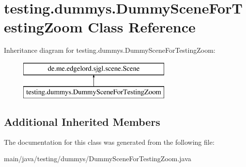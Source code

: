 \hypertarget{classtesting_1_1dummys_1_1_dummy_scene_for_testing_zoom}{}\section{testing.\+dummys.\+Dummy\+Scene\+For\+Testing\+Zoom Class Reference}
\label{classtesting_1_1dummys_1_1_dummy_scene_for_testing_zoom}
Inheritance diagram for testing.\+dummys.\+Dummy\+Scene\+For\+Testing\+Zoom\+:\begin{figure}[H]
\begin{center}
\leavevmode
\includegraphics[height=2.000000cm]{classtesting_1_1dummys_1_1_dummy_scene_for_testing_zoom}
\end{center}
\end{figure}
\subsection*{Additional Inherited Members}


The documentation for this class was generated from the following file\+:\begin{DoxyCompactItemize}
\item 
main/java/testing/dummys/Dummy\+Scene\+For\+Testing\+Zoom.\+java\end{DoxyCompactItemize}
